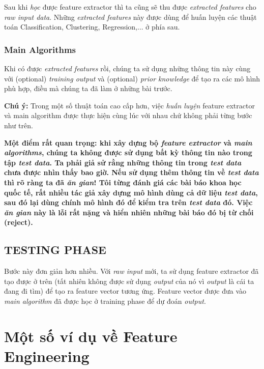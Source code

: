 Sau khi \textit{học} được feature extractor thì ta cũng sẽ thu được \textit{extracted features} cho \textit{raw input data}. Những \textit{extracted features} này được dùng để huấn luyện các thuật toán Classification, Clustering, Regression,... ở phía sau. 
 
 
\subsubsection{Main Algorithms }
Khi có được \textit{extracted features} rồi, chúng ta sử dụng những thông tin này cùng với (optional) \textit{training output} và (optional) \textit{prior knowledge} để tạo ra các mô hình phù hợp, điều mà chúng ta đã làm ở những bài trước.  
 
\textbf{Chú ý:} Trong một số thuật toán cao cấp hơn, việc \textit{huấn luyện} feature extractor và main algorithm được thực hiện cùng lúc với nhau chứ không phải từng bước như trên.  
 
\textbf{Một điểm rất quan trọng: khi xây dựng bộ \textit{feature extractor} và \textit{main algorithms}, chúng ta không được sử dụng bất kỳ thông tin nào trong tập \textit{test data}. Ta phải giả sử rằng những thông tin trong \textit{test data} chưa được nhìn thấy bao giờ. Nếu sử dụng thêm thông tin về \textit{test data} thì rõ ràng ta đã \textit{ăn gian}! Tôi từng đánh giá các bài báo khoa học quốc tế, rất nhiều tác giả xây dựng mô hình dùng cả dữ liệu \textit{test data}, sau đó lại dùng chính mô hình đó để kiểm tra trên \textit{test data} đó. Việc \textit{ăn gian} này là lỗi rất nặng và hiển nhiên những bài báo đó bị từ chối (reject).} 
 
 
\subsection{TESTING PHASE }
Bước này đơn giản hơn nhiều. Với \textit{raw input} mới, ta sử dụng feature extractor đã tạo được ở trên (tất nhiên không được sử dụng \textit{output} của nó vì \textit{output} là cái ta đang đi tìm) để tạo ra feature vector tương ứng. Feature vector được đưa vào \textit{main algorithm} đã được học ở training phase để dự đoán \textit{output}.  
 
 
\section{Một số ví dụ về Feature Engineering}
 
